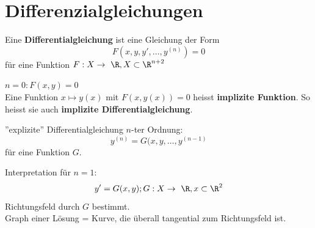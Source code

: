 \chapter{Differenzialgleichungen}
\begin{def*}[note = gewönliche Differentialgleichung $n$ter Ordnung , index = gewöhnliche Differentialgleichung , indexformat = {2!1~}]
	Eine \textbf{Differentialgleichung} ist eine Gleichung der Form
	\[ F( x , y , y' , \dotsc , y^{(n)} ) = 0 \]
	für eine Funktion $F : X \rightarrow \R , X \subset \R^{n+2}$
	
	$n=0 : F(x,y) = 0$ \\
	Eine Funktion $x \mapsto y(x)$ mit $F(x,y(x)) = 0$ heisst \textbf{implizite Funktion}. So heisst sie auch \textbf{implizite Differentialgleichung}.
	
	''explizite'' Differentialgleichung $n$-ter Ordnung:
	\[ y^(n) = G( x , y , \dotsc , y^{(n-1)} \]
	für eine Funktion $G$.
\end{def*}
Interpretation für $n=1$: \\
\[ y' = G(x,y) ; G : X \rightarrow \R , x \subset \R^2 \]
Richtungsfeld durch $G$ bestimmt. \\
Graph einer Lösung = Kurve, die überall tangential zum Richtungsfeld ist.

